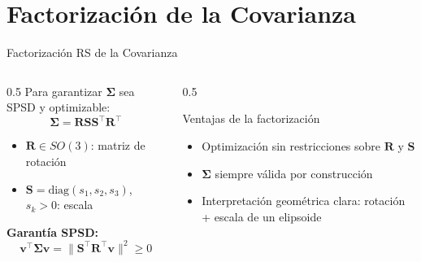 \section{Factorización de la Covarianza}

\begin{frame}{Factorización RS de la Covarianza}
  \begin{columns}
    \begin{column}{0.5\textwidth}
      Para garantizar $\boldsymbol{\Sigma}$ sea SPSD y optimizable:
      \[
        \boldsymbol{\Sigma} = \mathbf{R}\mathbf{S}\mathbf{S}^\top\mathbf{R}^\top
      \]
      \begin{itemize}
        \item $\mathbf{R} \in SO(3)$: matriz de rotación
        \item $\mathbf{S} = \mathrm{diag}(s_1, s_2, s_3)$, $s_k > 0$: escala
      \end{itemize}
      \vspace{0.5em}
      \textbf{Garantía SPSD:}
      \[
        \mathbf{v}^\top\boldsymbol{\Sigma}\mathbf{v} = \|\mathbf{S}^\top\mathbf{R}^\top\mathbf{v}\|^2 \geq 0
      \]
    \end{column}
    \begin{column}{0.5\textwidth}
      \begin{exampleblock}{Ventajas de la factorización}
        \begin{itemize}
          \item Optimización sin restricciones sobre $\mathbf{R}$ y $\mathbf{S}$
          \item $\boldsymbol{\Sigma}$ siempre válida por construcción
          \item Interpretación geométrica clara: rotación + escala de un elipsoide
        \end{itemize}
      \end{exampleblock}
    \end{column}
  \end{columns}
\end{frame}

